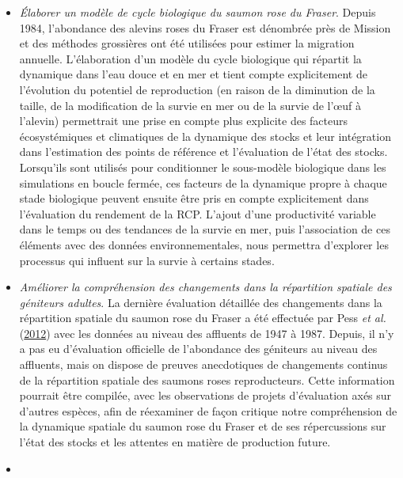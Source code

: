 \documentclass[french,11pt]{book}
\begin{document}
\begin{itemize}
\item
  \emph{Élaborer un modèle de cycle biologique du saumon rose du Fraser}. Depuis 1984, l'abondance des alevins roses du Fraser est dénombrée près de Mission et des méthodes grossières ont été utilisées pour estimer la migration annuelle. L'élaboration d'un modèle du cycle biologique qui répartit la dynamique dans l'eau douce et en mer et tient compte explicitement de l'évolution du potentiel de reproduction (en raison de la diminution de la taille, de la modification de la survie en mer ou de la survie de l'œuf à l'alevin) permettrait une prise en compte plus explicite des facteurs écosystémiques et climatiques de la dynamique des stocks et leur intégration dans l'estimation des points de référence et l'évaluation de l'état des stocks. Lorsqu'ils sont utilisés pour conditionner le sous-modèle biologique dans les simulations en boucle fermée, ces facteurs de la dynamique propre à chaque stade biologique peuvent ensuite être pris en compte explicitement dans l'évaluation du rendement de la RCP. L'ajout d'une productivité variable dans le temps ou des tendances de la survie en mer, puis l'association de ces éléments avec des données environnementales, nous permettra d'explorer les processus qui influent sur la survie à certains stades.
\item
  \emph{Améliorer la compréhension des changements dans la répartition spatiale des géniteurs adultes}. La dernière évaluation détaillée des changements dans la répartition spatiale du saumon rose du Fraser a été effectuée par Pess \emph{et al.} (\protect\hyperlink{ref-pessInfluencePopulationDynamics2012}{2012}) avec les données au niveau des affluents de 1947 à 1987. Depuis, il n'y a pas eu d'évaluation officielle de l'abondance des géniteurs au niveau des affluents, mais on dispose de preuves anecdotiques de changements continus de la répartition spatiale des saumons roses reproducteurs. Cette information pourrait être compilée, avec les observations de projets d'évaluation axés sur d'autres espèces, afin de réexaminer de façon critique notre compréhension de la dynamique spatiale du saumon rose du Fraser et de ses répercussions sur l'état des stocks et les attentes en matière de production future.
\item

\end{itemize}
\end{document}
